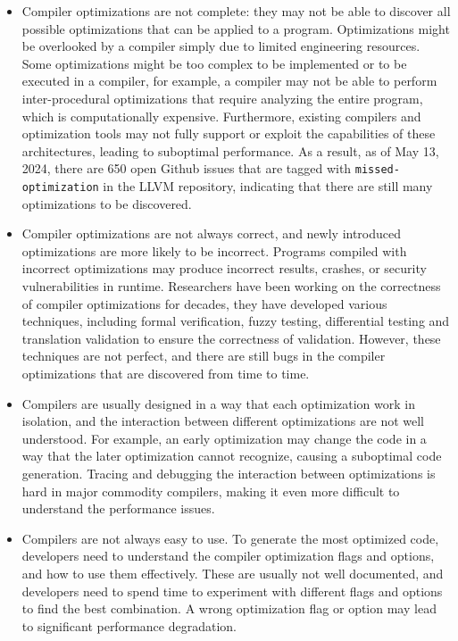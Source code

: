 \begin{itemize}

\item Compiler optimizations are not complete: they may not be able to
discover all possible optimizations that can be applied to a program.
%
Optimizations might be overlooked by a compiler simply due to limited
engineering resources.
%
Some optimizations might be too complex to be implemented or to be
executed in a compiler, for example, a compiler may not be able to
perform inter-procedural optimizations that require analyzing the
entire program, which is computationally expensive.
%
Furthermore, existing compilers and optimization tools may not fully
support or exploit the capabilities of these architectures, leading to
suboptimal performance.
%
As a result, as of May 13, 2024, there are 650 open Github issues that
are tagged with \texttt{missed-optimization} in the LLVM repository,
indicating that there are still many optimizations to be discovered.


\item Compiler optimizations are not always correct, and newly
introduced optimizations are more likely to be incorrect. Programs
compiled with incorrect optimizations may produce incorrect results,
crashes, or security vulnerabilities in runtime.
%
Researchers have been working on the correctness of compiler
optimizations for decades, they have developed various techniques,
including formal verification, fuzzy testing, differential testing and
translation validation to ensure the correctness of validation.
%
However, these techniques are not perfect, and there are still bugs in
the compiler optimizations that are discovered from time to time.


\item Compilers are usually designed in a way that each optimization
work in isolation, and the interaction between different optimizations
are not well understood.
%
For example, an early optimization may change the code in a way that
the later optimization cannot recognize, causing a suboptimal code
generation.
%
Tracing and debugging the interaction between optimizations is hard in
major commodity compilers, making it even more difficult to understand
the performance issues.

\item Compilers are not always easy to use. To generate the most
optimized code, developers need to understand the compiler
optimization flags and options, and how to use them effectively.
%
These are usually not well documented, and developers need to spend
time to experiment with different flags and options to find the best
combination.
%
A wrong optimization flag or option may lead to significant
performance degradation.

\end{itemize}

